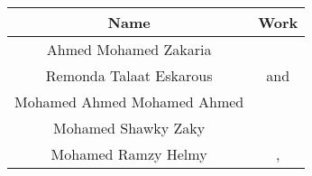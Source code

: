 \begin{center}
\begin{tabular}{||c |c ||} 
 \hline
 Name & Work \\ [0.5ex] 
 \hline\hline
  Ahmed Mohamed Zakaria & \nameref{sec:plugins} \\ 
 \hline
 Remonda Talaat Eskarous & \nameref{sec:hooks} and \nameref{sec:mock} \\
 \hline
 Mohamed Ahmed Mohamed Ahmed & \nameref{sec:fixtures}\\
 \hline
 Mohamed Shawky Zaky & \nameref{sec:skip_xfail} \\
 \hline
 Mohamed Ramzy Helmy &   \nameref{sec:explainations}, \nameref{sec:exceptions} \\ [1ex] 
 \hline
\end{tabular}
\end{center}